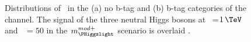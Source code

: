 \begin{figure}[h!]
\begin{center}
\end{center}
\caption[Distributions of \mTtot~inthe no b-tag and b-tag 
categories of the \etau channel.]{Distributions of \mTtot~in the (a) no b-tag and (b) b-tag categories 
of the \etau channel. The signal of the three neutral Higgs bosons at \mA~=$1\,\TeV$
and \tanb~$=50$ in the $m_{\PHiggslight}^{mod+}$ scenario is overlaid \cite{CMS-PAS-HIG-16-037}.}%
\label{fig:mssm_results_mttot_et}
\end{figure}

